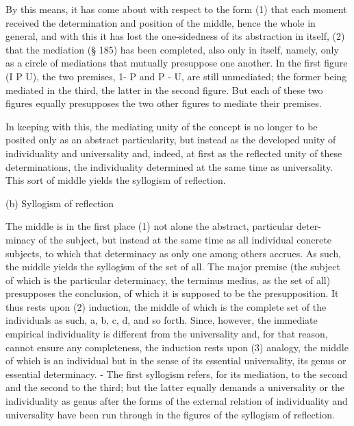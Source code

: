 By this means, it has come about with respect to the form (1) that each
moment received the determination and position of the middle, hence
the whole in general, and with this it has lost the one-sidedness of its
abstraction in itself, (2) that the mediation (§ 185) has been
completed, also only in itself, namely, only as a circle of mediations that
mutually presuppose one another. In the first figure (I P U), the two
premises, 1- P and P - U, are still unmediated; the former being mediated
in the third, the latter in the second figure. But each of these two figures
equally presupposes the two other figures to mediate their premises.

In keeping with this, the mediating unity of the concept is no longer
to be posited only as an abstract particularity, but instead as the developed
unity of individuality and universality and, indeed, at first as the reflected
unity of these determinations, the individuality determined at the same time
as universality. This sort of middle yields the syllogism of reflection.

(b) Syllogism of reflection

The middle is in the first place (1) not alone the abstract, particular deter-
minacy of the subject, but instead at the same time as all individual concrete
subjects, to which that determinacy as only one among others accrues. As
such, the middle yields the syllogism of the set of all.
The major premise (the subject of which is the particular determinacy, the
terminus medius, as the set of all) presupposes the conclusion, of which it
is supposed to be the presupposition. It thus rests upon (2) induction, the
middle of which is the complete set of the individuals as such, a,
b, c, d, and so forth. Since, however, the immediate empirical individuality
is different from the universality and, for that reason, cannot ensure any
completeness, the induction rests upon (3) analogy, the middle of which
is an individual but in the sense of its essential universality, its genus or
essential determinacy. - The first syllogism refers, for its mediation, to
the second and the second to the third; but the latter equally demands a
universality or the individuality as genus after the forms of the external
relation of individuality and universality have been run through in the
figures of the syllogism of reflection.

